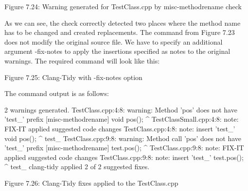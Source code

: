 \begin{center}
Figure 7.24: Warning generated for TestClass.cpp by misc-methodrename check
\end{center}


As we can see, the check correctly detected two places where the method name has to be changed and created replacements. The command from Figure 7.23 does not modify the original source file. We have to specify an additional argument -fix-notes to apply the insertions specified as notes to the original warnings. The required command will look like this:



\begin{center}
Figure 7.25: Clang-Tidy with -fix-notes option
\end{center}

The command output is as follows:

\begin{shell}
2 warnings generated.
TestClass.cpp:4:8: warning: Method 'pos' does not have 'test_' prefix
[misc-methodrename]
  void pos(){};
       ^
TestClassSmall.cpp:4:8: note: FIX-IT applied suggested code changes
TestClass.cpp:4:8: note: insert 'test_'
  void pos(){};
       ^
       test_
TestClass.cpp:9:8: warning: Method call 'pos' does not have 'test_' prefix
[misc-methodrename]
  test.pos();
       ^
TestClass.cpp:9:8: note: FIX-IT applied suggested code changes
TestClass.cpp:9:8: note: insert 'test_'
  test.pos();
       ^
       test_
clang-tidy applied 2 of 2 suggested fixes.
\end{shell}


\begin{center}
Figure 7.26: Clang-Tidy fixes applied to the TestClass.cpp
\end{center}

